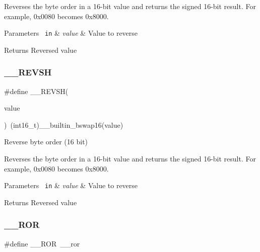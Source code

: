 Reverses the byte order in a 16-\/bit value and returns the signed 16-\/bit result. For example, 0x0080 becomes 0x8000. 
\begin{DoxyParams}[1]{Parameters}
\mbox{\texttt{ in}}  & {\em value} & Value to reverse \\
\hline
\end{DoxyParams}
\begin{DoxyReturn}{Returns}
Reversed value 
\end{DoxyReturn}
\mbox{\label{group___c_m_s_i_s___core___instruction_interface_gae580812686119c9c5cf3c11a7519a404}} 
\subsubsection{\texorpdfstring{\_\_REVSH}{\_\_REVSH}\hspace{0.1cm}{\footnotesize\ttfamily [2/2]}}
{\footnotesize\ttfamily \#define \+\_\+\+\_\+\+R\+E\+V\+SH(\begin{DoxyParamCaption}\item[{}]{value }\end{DoxyParamCaption})~(int16\+\_\+t)\+\_\+\+\_\+builtin\+\_\+bswap16(value)}



Reverse byte order (16 bit) 

Reverses the byte order in a 16-\/bit value and returns the signed 16-\/bit result. For example, 0x0080 becomes 0x8000. 
\begin{DoxyParams}[1]{Parameters}
\mbox{\texttt{ in}}  & {\em value} & Value to reverse \\
\hline
\end{DoxyParams}
\begin{DoxyReturn}{Returns}
Reversed value 
\end{DoxyReturn}
\mbox{\label{group___c_m_s_i_s___core___instruction_interface_ga95b9bd281ddeda378b85afdb8f2ced86}} 
\subsubsection{\texorpdfstring{\_\_ROR}{\_\_ROR}}
{\footnotesize\ttfamily \#define \+\_\+\+\_\+\+R\+OR~\+\_\+\+\_\+ror}



